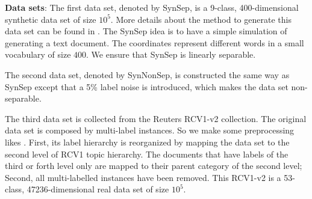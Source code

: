 \documentclass[twocolumn]{article}
\begin{document}
\textbf{Data sets}:
The first data set, denoted by SynSep,  is a 9-class, 400-dimensional synthetic data set of size $10^5$. More details about the method to generate this data set can be found in \cite{kakade2008efficient}. The SynSep  idea is to have a simple simulation of generating a text document. The coordinates represent different words in a small vocabulary of size $400$. We ensure that SynSep is linearly separable. 

The second data set, denoted by SynNonSep, is constructed  the same way as  SynSep except that a 5\% label noise is introduced, which makes the data set non-separable. 

The third data set is collected from the Reuters RCV1-v2 collection\cite{David04RCV}. The original data set is composed by multi-label instances. So we make some preprocessing likes \cite{RB08a}. First, its label hierarchy is reorganized by mapping the data set to the second level of RCV1 topic hierarchy. The documents that have labels of the third or forth level only are mapped to their parent category of the second level; Second, all multi-labelled instances have been removed. This RCV1-v2 is a 53-class,  47236-dimensional real data set of size $10^5$. 

\end{document}
